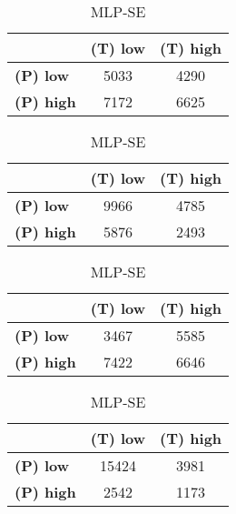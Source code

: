 \begin{table}[htbp]
\centering
\begin{minipage}{.3\textwidth}
\tiny
\caption*{MLP-AP}
\begin{tabular}{|l|c|c|}
\hline
					& \textbf{(T) low}	& \textbf{(T) high}	\\ \hline
\textbf{(P) low}	& 5033				& 4290				\\ \hline
\textbf{(P) high}	& 7172				& 6625				\\ \hline
\end{tabular}
\end{minipage}\hfill
\begin{minipage}{.3\textwidth}
\tiny
\caption*{MLP-AT}
\begin{tabular}{|l|c|c|}
\hline
					& \textbf{(T) low}	& \textbf{(T) high}	\\ \hline
\textbf{(P) low}	& 9966				& 4785				\\ \hline
\textbf{(P) high}	& 5876				& 2493				\\ \hline
\end{tabular}
\end{minipage}\hfill
\begin{minipage}{.3\textwidth}
\tiny
\caption*{MLP-PL}
\begin{tabular}{|l|c|c|}
\hline
					& \textbf{(T) low}	& \textbf{(T) high}	\\ \hline
\textbf{(P) low}	& 3467				& 5585				\\ \hline
\textbf{(P) high}	& 7422				& 6646				\\ \hline
\end{tabular}
\end{minipage}\hfill
\begin{minipage}{.3\textwidth}
\tiny
\caption*{MLP-SE}
\begin{tabular}{|l|c|c|}
\hline
					& \textbf{(T) low}	& \textbf{(T) high}	\\ \hline
\textbf{(P) low}	& 15424				& 3981				\\ \hline
\textbf{(P) high}	& 2542				& 1173				\\ \hline
\end{tabular}
\end{minipage}\hfill
\end{table}